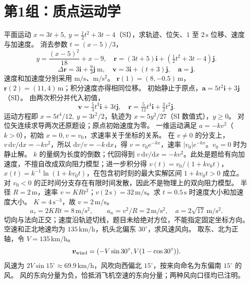 \section{第1组：质点运动学}
\problemtext 平面运动 $x=3t+5,\ y=\tfrac12t^2+3t-4$（SI），求轨迹、位矢、$1$ 至 $2\,\mathrm s$ 位移、速度与加速度。
\workings 消去参数 $t=(x-5)/3$，
\[
y=\frac{(x-5)^2}{18}+x-9,\quad
\bm r=(3t+5)\bm i+(\tfrac12t^2+3t-4)\bm j.
\]
\[
\Delta\bm r=3\bm i+\tfrac92\bm j\ \mathrm m,\quad
\bm v=3\bm i+(t+3)\bm j,\quad\bm a=\bm j.
\]
速度和加速度分别采用 $\mathrm{m/s}$、$\mathrm{m/s^2}$。
\crosscheck $\bm r(1)=(8,-0.5)\,\mathrm m$，$\bm r(2)=(11,4)\,\mathrm m$；积分速度亦得相同位移。
\problemtext 初始静止于原点，$\bm a=5t^2\bm i+3\bm j$（SI）。
\workings 由两次积分并代入初值，
\[
\bm v=\tfrac53t^3\bm i+3t\bm j,\quad
\bm r=\tfrac5{12}t^4\bm i+\tfrac32t^2\bm j.
\]
运动方程即 $x=5t^4/12,\ y=3t^2/2$，轨迹为 $x=5y^2/27$（SI 数值式），$y\ge0$。
\crosscheck 对位矢连续求导两次还原题设；原点初始速度为零。
\problemtext 一维运动满足 $a=-kv^2$（$k>0$），初始 $x=0,v=v_0$，求速率关于坐标的关系。
\workings 在 $v\ne0$ 的分支上，$v\,\mathrm dv/\mathrm dx=-kv^2$，所以 $\mathrm dv/v=-k\,\mathrm dx$，得 $v=v_0e^{-kx}$，速率 $|v_0|e^{-kx}$。$v_0=0$ 时为静止解。
\crosscheck $k$ 的量纲为长度的倒数；代回得到 $v\,\mathrm dv/\mathrm dx=-kv^2$。此处是题给有向加速度，不擅自改成双向阻力模型；进一步积分得 $v(t)=v_0/(1+kv_0t)$，$x(t)=k^{-1}\ln(1+kv_0t)$，在包含初时刻的最大实解区间 $1+kv_0t>0$ 成立。对 $v_0<0$ 的正时间分支存在有限时间发散，因此不是物理上的双向阻力模型。
\problemtext 半径 $R=2\,\mathrm m$，速率 $v=KRt^2$；$v(2\,\mathrm s)=32\,\mathrm{m/s}$。求 $t=0.5\,\mathrm s$ 时速度大小和加速度大小。
\workings $K=4\,\mathrm{s^{-3}}$，故 $v=2\,\mathrm{m/s}$。
\[
a_\tau=2KRt=8\,\mathrm{m/s^2},\qquad
a_n=v^2/R=2\,\mathrm{m/s^2},
\quad a=2\sqrt{17}\,\mathrm{m/s^2}.
\]
\crosscheck 切向与法向正交；速度沿轨迹切线，题目未给绝对方位，不能指定固定坐标方向。
\problemtext 空速和正北地速均为 $135\,\mathrm{km/h}$，机头北偏东 $30^\circ$，求风速风向。
\workings 取东、北为正轴，令 $V=135\,\mathrm{km/h}$。
\[
\bm v_{\rm wind}=(-V\sin30^\circ,V(1-\cos30^\circ)).
\]
风速为 $2V\sin15^\circ\approx69.9\,\mathrm{km/h}$，风吹向西偏北 $15^\circ$，按来向命名为东偏南 $15^\circ$ 的风。
\crosscheck 风的东向分量为负，恰抵消飞机空速的东向分量；两种风向口径均已注明。
